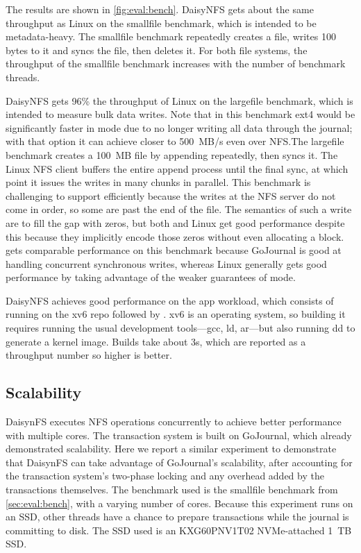 The results are shown in \autoref{fig:eval:bench}. DaisyNFS gets about the same
throughput as Linux on the smallfile benchmark, which is intended to
be metadata-heavy. The smallfile benchmark repeatedly creates a file,
writes 100 bytes to it and syncs the file, then deletes it. For both file
systems, the throughput of the smallfile benchmark increases with the
number of benchmark threads.

DaisyNFS gets 96\% the throughput of Linux on the largefile benchmark, which is
intended to measure bulk data writes. Note that in this benchmark ext4 would be
significantly faster in  mode due to no longer writing all data
through the journal; with that option it can achieve closer to 500~MB/s even over
NFS.\@ The largefile benchmark creates a 100~MB file by appending repeatedly, then
syncs it. The Linux NFS client buffers the entire append process until the final
sync, at which point it issues the writes in many chunks in parallel. This
benchmark is challenging to support efficiently because the writes at the NFS
server do not come in order, so some are past the end of the file. The semantics
of such a write are to fill the gap with zeros, but both \sys and Linux get good
performance despite this because they implicitly encode those zeros without even
allocating a block. \sys gets comparable performance on this benchmark because
GoJournal is good at handling concurrent synchronous writes, whereas Linux
generally gets good performance by taking advantage of the weaker guarantees of
 mode.

DaisyNFS achieves good performance on the app workload, which consists of running
 on the xv6 repo followed by . xv6 is an operating
system, so building it requires running the usual development tools---gcc, ld,
ar---but also running dd to generate a kernel image. Builds take about 3s,
which are reported as a throughput number so higher is better.

\subsection{Scalability}
\label{sec:eval:scale}

DaisynFS executes NFS operations concurrently to achieve better performance with
multiple cores. The transaction system is built on GoJournal, which already
demonstrated scalability. Here we report a similar experiment to demonstrate
that DaisynFS can take advantage of GoJournal's scalability, after accounting for
the transaction system's two-phase locking and any overhead added by the
transactions themselves. The benchmark used is the smallfile benchmark from
\autoref{sec:eval:bench}, with a varying number of cores. Because this experiment runs
on an SSD, other threads have a chance to prepare transactions while the
journal is committing to disk. The SSD used is an KXG60PNV1T02 NVMe-attached
1~TB SSD.

